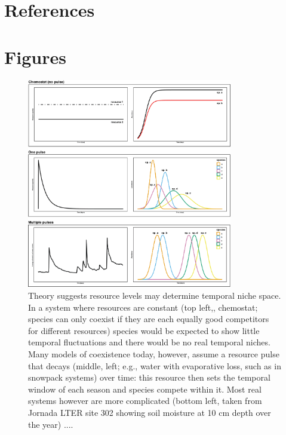 \documentclass[11pt]{article}
\begin{document}

\newpage
\section{References}


\newpage
\section{Figures}


\begin{figure}[h!]
\centering
\includegraphics[width=0.8\textwidth]{..//figures/JN_conceptfigs/sixpanel_concept.png}
\caption{Theory suggests resource levels may determine temporal niche space. In a system where resources are constant (top left,, chemostat; species can only coexist if they are each equally good competitors for different resources) species would be expected to show little temporal fluctuations and there would be no real temporal niches. Many models of coexistence today, however, assume a resource pulse that decays (middle, left; e.g., water with evaporative loss, such as in snowpack systems) over time: this resource then sets the temporal window of each season and species compete within it. Most real systems however are more complicated (bottom left, taken from Jornada LTER site 302 showing soil moisture at 10 cm depth over the year) ....} 
 \label{fig:resource}
\end{figure}
\end{document}
